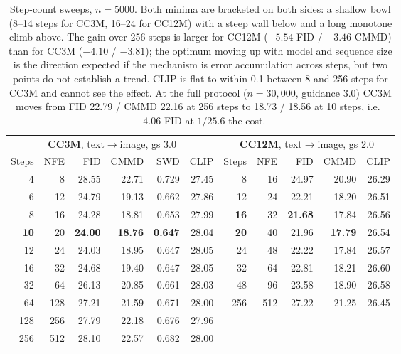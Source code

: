 \begin{table}[tb]
\centering
\footnotesize
\setlength{\tabcolsep}{3.5pt}
\begin{tabular}{rrrrrr@{\hspace{12pt}}rrrrr}
\toprule
\multicolumn{6}{c}{\textbf{CC3M}, text$\rightarrow$image, gs 3.0} & \multicolumn{5}{c}{\textbf{CC12M}, text$\rightarrow$image, gs 2.0} \\
\cmidrule(lr){1-6}\cmidrule(lr){7-11}
Steps & NFE & FID & CMMD & SWD & CLIP & Steps & NFE & FID & CMMD & CLIP \\
\midrule
4 & 8 & 28.55 & 22.71 & 0.729 & 27.45 & 8 & 16 & 24.97 & 20.90 & 26.29 \\
6 & 12 & 24.79 & 19.13 & 0.662 & 27.86 & 12 & 24 & 22.21 & 18.20 & 26.51 \\
8 & 16 & 24.28 & 18.81 & 0.653 & 27.99 & \textbf{16} & 32 & \textbf{21.68} & 17.84 & 26.56 \\
\textbf{10} & 20 & \textbf{24.00} & \textbf{18.76} & \textbf{0.647} & 28.04 & \textbf{20} & 40 & 21.96 & \textbf{17.79} & 26.54 \\
12 & 24 & 24.03 & 18.95 & 0.647 & 28.05 & 24 & 48 & 22.22 & 17.84 & 26.57 \\
16 & 32 & 24.68 & 19.40 & 0.647 & 28.05 & 32 & 64 & 22.81 & 18.21 & 26.60 \\
32 & 64 & 26.13 & 20.85 & 0.661 & 28.03 & 48 & 96 & 23.58 & 18.90 & 26.58 \\
64 & 128 & 27.21 & 21.59 & 0.671 & 28.00 & 256 & 512 & 27.22 & 21.25 & 26.45 \\
128 & 256 & 27.79 & 22.18 & 0.676 & 27.96 & & & & & \\
256 & 512 & 28.10 & 22.57 & 0.682 & 28.00 & & & & & \\
\bottomrule
\end{tabular}
\caption{Step-count sweeps, $n{=}5000$. Both minima are bracketed on both sides: a shallow bowl
(8--14 steps for CC3M, 16--24 for CC12M) with a steep wall below and a long monotone climb above.
The gain over 256 steps is larger for CC12M ($-5.54$ FID / $-3.46$ CMMD) than for CC3M ($-4.10$
/ $-3.81$); the optimum moving up with model and sequence size is the direction expected if the
mechanism is error accumulation across steps, but two points do not establish a trend. CLIP is
flat to within 0.1 between 8 and 256 steps for CC3M and cannot see the effect. At the full
protocol ($n{=}30{,}000$, guidance 3.0) CC3M moves from FID 22.79 / CMMD 22.16 at 256 steps to
18.73 / 18.56 at 10 steps, i.e.\ $-4.06$ FID at $1/25.6$ the cost.}
\label{tab:app:image:steps}
\end{table}

